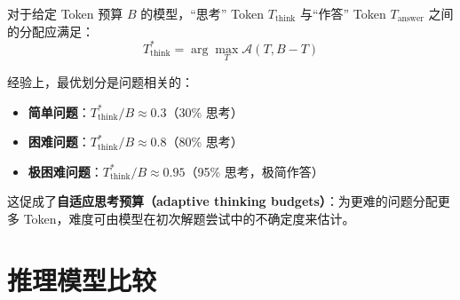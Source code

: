 对于给定 Token 预算 $B$ 的模型，“思考” Token $T_{\text{think}}$ 与“作答” Token $T_{\text{answer}}$ 之间的分配应满足：
\begin{equation}
    T_{\text{think}}^* = \arg\max_{T} \mathcal{A}(T, B - T)
\end{equation}

经验上，最优划分是问题相关的：

\begin{itemize}
  \item \textbf{简单问题}：$T_{\text{think}}^* / B \approx 0.3$（30\% 思考）
  \item \textbf{困难问题}：$T_{\text{think}}^* / B \approx 0.8$（80\% 思考）
  \item \textbf{极困难问题}：$T_{\text{think}}^* / B \approx 0.95$（95\% 思考，极简作答）
\end{itemize}

这促成了\textbf{自适应思考预算（adaptive thinking budgets）}：为更难的问题分配更多 Token，难度可由模型在初次解题尝试中的不确定度来估计。

\section{推理模型比较}
\label{subsec:reasoning_comparison}

